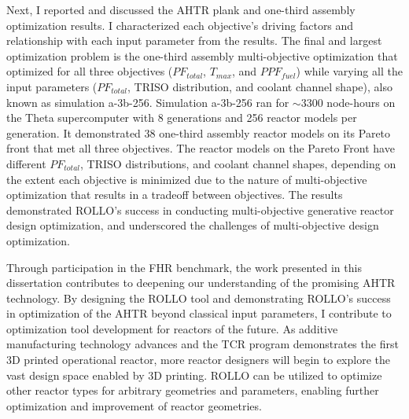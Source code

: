 Next, I reported and discussed the \gls{AHTR} plank and one-third assembly optimization 
results.  
I characterized each objective's driving factors and relationship with each input 
parameter from the results. 
The final and largest optimization problem is the one-third assembly multi-objective 
optimization that optimized for all three objectives ($PF_{total}$, $T_{max}$, and 
$PPF_{fuel}$) while varying all the input parameters ($PF_{total}$, TRISO distribution, 
and coolant channel shape), also known as simulation a-3b-256. 
Simulation a-3b-256 ran for $\sim 3300$ node-hours on the Theta supercomputer with 
8 generations and 256 reactor models per generation. 
It demonstrated 38 one-third assembly reactor models on its Pareto front that met all 
three objectives. 
The reactor models on the Pareto Front have different $PF_{total}$, TRISO distributions, 
and coolant channel shapes, depending on the extent each objective is minimized due 
to the nature of multi-objective optimization that results in a tradeoff between 
objectives. 
The results demonstrated \gls{ROLLO}'s success in conducting multi-objective generative 
reactor design optimization, and underscored the challenges of multi-objective 
design optimization. 

Through participation in the \gls{FHR} benchmark, the work presented in this 
dissertation contributes to deepening our understanding of the promising 
\gls{AHTR} technology. 
By designing the \gls{ROLLO} tool and demonstrating \gls{ROLLO}'s success in 
optimization of the \gls{AHTR} beyond classical input parameters, I contribute to 
optimization tool development for reactors of the future. 
As additive manufacturing technology advances and the \gls{TCR} program 
demonstrates the first 3D printed operational reactor, more reactor designers 
will begin to explore the vast design space enabled by 3D printing. 
\gls{ROLLO} can be utilized to optimize other reactor types for arbitrary
geometries and parameters, enabling further optimization and improvement of reactor 
geometries.